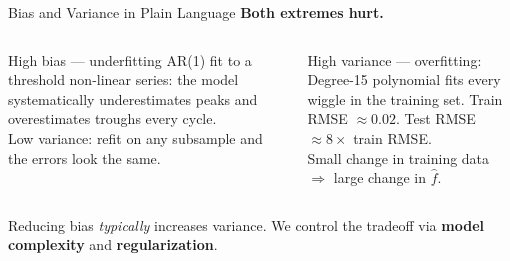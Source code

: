 \documentclass[aspectratio=169, 11pt]{beamer}
\begin{document}
\begin{frame}{Bias and Variance in Plain Language}
  \textbf{Both extremes hurt.}
  \begin{columns}[T]
      \begin{examplebox}{High bias --- underfitting}
        {\small AR(1) fit to a threshold non-linear series:
        the model systematically underestimates peaks
        and overestimates troughs every cycle.\\[3pt]
        Low variance: refit on any subsample and the
        errors look the same.}
      \end{examplebox}
      \begin{warningbox}
        {\small High variance --- overfitting:\\[2pt]
        Degree-15 polynomial fits every wiggle in the
        training set. Train RMSE $\approx 0.02$.
        Test RMSE $\approx 8\times$ train RMSE.\\[3pt]
        Small change in training data $\Rightarrow$
        large change in $\hat{f}$.}
      \end{warningbox}
  \end{columns}
  \vspace{0.1cm}
  Reducing bias \emph{typically} increases variance.
  We control the tradeoff via \textbf{model complexity} and
  \textbf{regularization}.
\end{frame}
\end{document}
